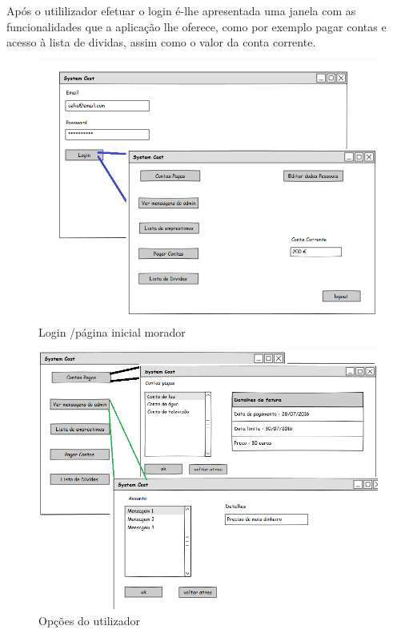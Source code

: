 Após o utililizador efetuar o login é-lhe apresentada uma janela com as funcionalidades que a aplicação lhe oferece, como por exemplo pagar contas e acesso à lista de dividas, assim como o valor da conta corrente. 

\begin{figure}[htb!]
	\centering
	\includegraphics[scale=0.5]{imagens/mockups/logUtilizador}  
	\caption{Login /página inicial morador}  
\end{figure}

\begin{figure}[h!]
	\centering
	\includegraphics[scale=0.5]{imagens/mockups/tarefasutilizador}  
	\caption{Opções do utilizador }  
\end{figure}

